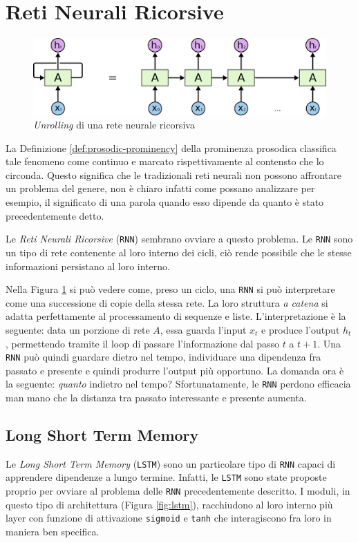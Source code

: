 \documentclass[twoside,twocolumn,10pt]{extarticle}
\theoremstyle{definition}
\begin{document}
\section{Reti Neurali Ricorsive}\label{sec:rnn}
	\begin{figure}[h]
		\centering
		\includegraphics[scale=.4]{img/rnn.png}
		\caption{\textit{Unrolling} di una rete neurale ricorsiva}
		\label{fig:unroll}
	\end{figure}
	La Definizione \ref{def:prosodic-prominency} della prominenza prosodica classifica tale fenomeno come continuo e marcato rispettivamente al contensto che lo circonda. Questo significa che le tradizionali reti neurali non possono affrontare un problema del genere, non è chiaro infatti come possano analizzare per esempio, il significato di una parola quando esso dipende da quanto è stato precedentemente detto.
	
	Le \textit{Reti Neurali Ricorsive} (\texttt{RNN}) sembrano ovviare a questo problema. Le \texttt{RNN} sono un tipo di rete contenente al loro interno dei cicli, ciò rende possibile che le stesse informazioni persistano al loro interno.

	Nella Figura \ref{fig:unroll} si può vedere come, preso un ciclo, una \texttt{RNN} si può interpretare come una successione di copie della stessa rete. La loro struttura \textit{a catena} si adatta perfettamente al processamento di sequenze e liste. L'interpretazione è la seguente: data un porzione di rete $A$, essa guarda l'input $x_t$ e produce l'output $h_t$, permettendo tramite il loop di passare l'informazione dal passo $t$ a $t + 1$. Una \texttt{RNN} può quindi guardare dietro nel tempo, individuare una dipendenza fra passato e presente e quindi produrre l'output più opportuno. La domanda ora è la seguente: \textit{quanto} indietro nel tempo? Sfortunatamente, le \texttt{RNN} perdono efficacia man mano che la distanza tra passato interessante e presente aumenta.
	
	\subsection{Long Short Term Memory}\label{subsec:lstm}
		Le \textit{Long Short Term Memory} (\texttt{LSTM}) sono un particolare tipo di \texttt{RNN} capaci di apprendere dipendenze a lungo termine. Infatti, le \texttt{LSTM} sono state proposte proprio per ovviare al problema delle \texttt{RNN} precedentemente descritto. I moduli, in questo tipo di architettura (Figura \ref{fig:lstm}), racchiudono al loro interno più layer con funzione di attivazione \texttt{sigmoid} e \texttt{tanh} che interagiscono fra loro in maniera ben specifica.
		
\end{document}
